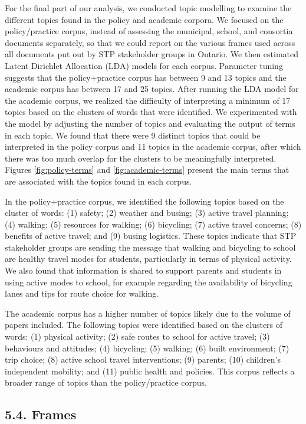 \documentclass[]{elsarticle} %
\begin{document}
For the final part of our analysis, we conducted topic modelling to
examine the different topics found in the policy and academic corpora.
We focused on the policy/practice corpus, instead of assessing the
municipal, school, and consortia documents separately, so that we could
report on the various frames used across all documents put out by STP
stakeholder groups in Ontario. We then estimated Latent Dirichlet
Allocation (LDA) models for each corpus. Parameter tuning suggests that
the policy+practice corpus has between 9 and 13 topics and the academic
corpus has between 17 and 25 topics. After running the LDA model for the
academic corpus, we realized the difficulty of interpreting a minimum of
17 topics based on the clusters of words that were identified. We
experimented with the model by adjusting the number of topics and
evaluating the output of terms in each topic. We found that there were 9
distinct topics that could be interpreted in the policy corpus and 11
topics in the academic corpus, after which there was too much overlap
for the clusters to be meaningfully interpreted. Figures
\ref{fig:policy-terms} and \ref{fig:academic-terms} present the main
terms that are associated with the topics found in each corpus.

In the policy+practice corpus, we identified the following topics based
on the cluster of words: (1) safety; (2) weather and busing; (3) active
travel planning; (4) walking; (5) resources for walking; (6) bicycling;
(7) active travel concerns; (8) benefits of active travel; and (9)
busing logistics. These topics indicate that STP stakeholder groups are
sending the message that walking and bicycling to school are healthy
travel modes for students, particularly in terms of physical activity.
We also found that information is shared to support parents and students
in using active modes to school, for example regarding the availability
of bicycling lanes and tips for route choice for walking.

The academic corpus has a higher number of topics likely due to the
volume of papers included. The following topics were identified based on
the clusters of words: (1) physical activity; (2) safe routes to school
for active travel; (3) behaviours and attitudes; (4) bicycling; (5)
walking; (6) built environment; (7) trip choice; (8) active school
travel interventions; (9) parents; (10) children's independent mobility;
and (11) public health and policies. This corpus reflects a broader
range of topics than the policy/practice corpus.

\hypertarget{frames}{%
\subsection{5.4. Frames}\label{frames}}
\end{document}
